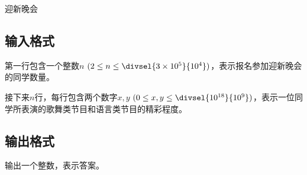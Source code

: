 \begin{Problem}{迎新晚会}{}
\subsection*{输入格式}

第一行包含一个整数$n$ $(2 \leq n \leq \divsel{3 \times 10^5}{10^4})$，表示报名参加迎新晚会的同学数量。

接下来$n$行，每行包含两个数字$x, y$ $(0 \leq x, y \leq \divsel{10^{18}}{10^9})$，表示一位同学所表演的歌舞类节目和语言类节目的精彩程度。

\ifodd\value{page}
\newpage
\fi

\subsection*{输出格式}

输出一个整数，表示答案。


\end{Problem}
